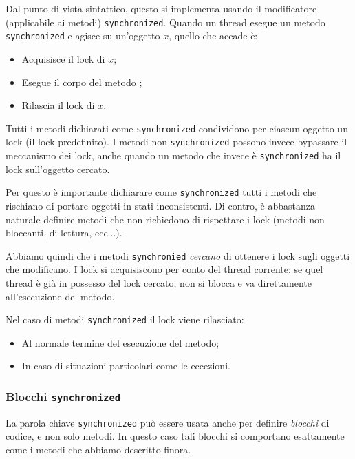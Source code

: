 \documentclass[a4paper,11pt]{article}
\begin{document}
Dal punto di vista sintattico, questo si implementa usando il modificatore (applicabile ai metodi) \lstinline|synchronized|.
Quando un thread esegue un metodo \lstinline|synchronized| e agisce su un'oggetto $x$, quello che accade è:
\begin{itemize}
	\item Acquisisce il lock di $x$;
	\item Esegue il corpo del metodo ;
	\item Rilascia il lock di $x$.
\end{itemize}

Tutti i metodi dichiarati come \lstinline|synchronized| condividono per ciascun oggetto un lock (il lock predefinito).
I metodi non \lstinline|synchronized| possono invece bypassare il meccanismo dei lock, anche quando un metodo che invece è \lstinline|synchronized| ha il lock sull'oggetto cercato.

Per questo è importante dichiarare come \lstinline|synchronized| tutti i metodi che rischiano di portare oggetti in stati inconsistenti.
Di contro, è abbastanza naturale definire metodi che non richiedono di rispettare i lock (metodi non bloccanti, di lettura, ecc...). 

Abbiamo quindi che i metodi \lstinline|synchronied| \textit{cercano} di ottenere i lock sugli oggetti che modificano.
I lock si acquisiscono per conto del thread corrente: se quel thread è già in possesso del lock cercato, non si blocca e va direttamente all'esecuzione del metodo.

Nel caso di metodi \lstinline|synchronized| il lock viene rilasciato:
\begin{itemize}
	\item Al normale termine del esecuzione del metodo;
	\item In caso di situazioni particolari come le eccezioni.
\end{itemize}

\subsubsection{Blocchi \lstinline|synchronized|}
La parola chiave \lstinline|synchronized| può essere usata anche per definire \textit{blocchi} di codice, e non solo metodi.
In questo caso tali blocchi si comportano esattamente come i metodi che abbiamo descritto finora.
\end{document}
